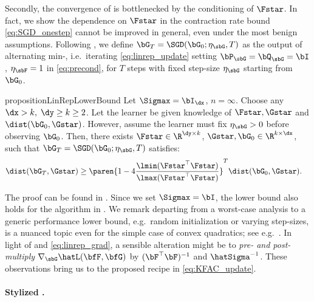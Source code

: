 Secondly, the convergence of \SGD is bottlenecked by the conditioning of $\Fstar$. In fact, we show the dependence on $\Fstar$ in the contraction rate bound \eqref{eq:SGD_onestep} cannot be improved in general, even under the most benign assumptions.
Following \citet{collins2021exploiting, vaswani2024efficient}, we define $\bG_T = \SGD(\bG_0; \eta_\sbG, T)$ as the output of alternating min-\SGD, i.e.\ iterating \eqref{eq:linrep_update} setting $\bP_\sbG = \bQ_\sbG = \bI$, $\eta_\sbF = 1$ in \eqref{eq:precond}, for $T$ steps with fixed step-size $\eta_\sbG$ starting from $\bG_0$. 
\begin{restatable}{proposition}{LinRepLowerBound}\label{prop:linrep_SGD_lower_bound}
    Let $\Sigmax = \bI_{\dx}$, $n = \infty$. Choose any $\dx > k,\;\dy \geq k \geq 2$. Let the learner be given knowledge of $\Fstar, \Gstar$ and $\dist(\bG_0, \Gstar)$. However, assume the learner must fix $\eta_\sbG > 0$ before observing $\bG_0$. Then, there exists $\Fstar \in \R^{\dy \times k}$, $\Gstar, \bG_0 \in \R^{k \times \dx}$, such that
    $\bG_T = \SGD(\bG_0; \eta_\sbG, T)$ satisfies:
    \begin{align*}
        \dist(\bG_T, \Gstar) &\geq \paren{1 - 4 \frac{\lmin(\Fstar^\top \Fstar)}{\lmax(\Fstar^\top \Fstar)}}^T \dist(\bG_0, \Gstar).
    \end{align*}
\end{restatable}

The proof can be found in .
Since we set $\Sigmax = \bI$, the lower bound also holds for the algorithm in \citet{zhang2023meta}. We remark departing from a worst-case analysis to a generic performance lower bound, e.g.\ random initialization or varying step-sizes, is a nuanced topic even for the simple case of convex quadratics; see e.g.\ \citet{bach2024scaling, altschuler2023acceleration}.
In light of  and \eqref{eq:linrep_grad}, a sensible alteration might be to \emph{pre- and post- multiply} $\nabla_{\sbG} \hatL(\bfF, \bfG)$ by $(\bF^\top \bF)^{-1}$ and $\hatSigma^{-1}$. These observations bring us to the proposed recipe in \eqref{eq:KFAC_update}.

\paragraph{Stylized \KFAC.}

